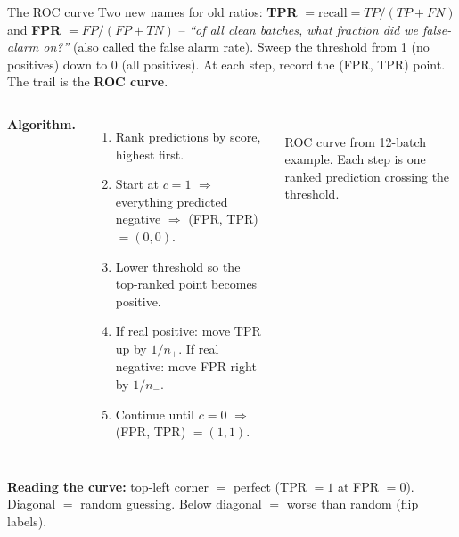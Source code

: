 \documentclass[aspectratio=169]{beamer}
\begin{document}
\begin{frame}{The ROC curve}
  Two new names for old ratios: \textbf{TPR} $= \text{recall} = TP/(TP+FN)$ and \textbf{FPR} $= FP/(FP+TN)$ -- \emph{``of all clean batches, what fraction did we false-alarm on?''} (also called the false alarm rate).
  \vskip 2pt
  Sweep the threshold from 1 (no positives) down to 0 (all positives). At each step, record the (FPR, TPR) point. The trail is the \textbf{ROC curve}.
  \vfill
  \begin{columns}[T]
    \footnotesize
    \textbf{Algorithm.}
    \begin{enumerate}\footnotesize
      \item Rank predictions by score, highest first.
      \item Start at $c = 1$ $\Rightarrow$ everything predicted negative $\Rightarrow$ (FPR, TPR) $= (0, 0)$.
      \item Lower threshold so the top-ranked point becomes positive.
      \item If real positive: move TPR up by $1/n_+$. If real negative: move FPR right by $1/n_-$.
      \item Continue until $c = 0$ $\Rightarrow$ (FPR, TPR) $= (1, 1)$.
    \end{enumerate}
    \begin{center}
      \\
      \scriptsize ROC curve from 12-batch example. Each step is one ranked prediction crossing the threshold.
    \end{center}
  \end{columns}
  \vfill
  \footnotesize \textbf{Reading the curve:} top-left corner $=$ perfect (TPR $= 1$ at FPR $= 0$). Diagonal $=$ random guessing. Below diagonal $=$ worse than random (flip labels).
\end{frame}
\end{document}
